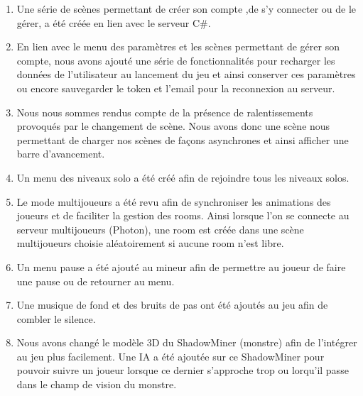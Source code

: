 \documentclass[titlepage, 13px, a4paper]{report}
\begin{document}
{\begin{enumerate}
		l’activation ou la désactivation du mode plein écran, de changer la fréquence d’affichage, de régler la sensibilité de la souris, 
		de changer les touches, de changer le volume sonore de la musique et des effets sonores. \\
	\item Une série de scènes permettant de créer son compte ,de s'y connecter ou de le gérer, a été créée en lien avec le serveur C\#. \newpage
	\item En lien avec le menu des paramètres et les scènes permettant de gérer son compte, 
		nous avons ajouté une série de fonctionnalités pour recharger les données de l’utilisateur au lancement du jeu 
		et ainsi conserver ces paramètres ou encore sauvegarder le token et l’email pour la reconnexion au serveur. \\
	\item Nous nous sommes rendus compte de la présence de ralentissements provoqués par le changement de scène. 
		Nous avons donc une scène nous permettant de charger nos scènes de façons asynchrones et ainsi afficher une barre d’avancement. \\
	\item Un menu des niveaux solo a été créé afin de rejoindre tous les niveaux solos. \\
	\item Le mode multijoueurs a été revu afin de synchroniser les animations des joueurs et de faciliter la gestion des rooms.
		Ainsi lorsque l'on se connecte au serveur multijoueurs (Photon), une room est créée dans une scène multijoueurs 
		choisie aléatoirement si aucune room n’est libre. \\
	\item Un menu pause a été ajouté au mineur afin de permettre au joueur de faire une pause ou de retourner au menu. \\
	\item Une musique de fond et des bruits de pas ont été ajoutés au jeu afin de combler le silence. \\
	\item Nous avons changé le modèle 3D du ShadowMiner (monstre) afin de l’intégrer au jeu plus facilement.
		Une IA a été ajoutée sur ce ShadowMiner pour pouvoir suivre un joueur lorsque ce dernier s’approche trop ou lorqu’il passe 
		dans le champ de vision du monstre. \\

\end{enumerate}}
\end{document}
